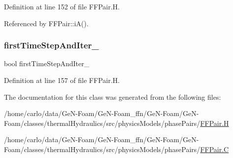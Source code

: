 Definition at line 152 of file F\+F\+Pair.\+H.



Referenced by F\+F\+Pair\+::i\+A().

\mbox{\label{classFoam_1_1FFPair_afb9a1b92dd096336989bbbea04ee183b}} 
\subsubsection{\texorpdfstring{first\+Time\+Step\+And\+Iter\+\_\+}{firstTimeStepAndIter\_}}
{\footnotesize\ttfamily bool first\+Time\+Step\+And\+Iter\+\_\+\hspace{0.3cm}{\ttfamily [protected]}}



Definition at line 157 of file F\+F\+Pair.\+H.



The documentation for this class was generated from the following files\+:\begin{DoxyCompactItemize}
\item 
/home/carlo/data/\+Ge\+N-\/\+Foam/\+Ge\+N-\/\+Foam\+\_\+ffn/\+Ge\+N-\/\+Foam/\+Ge\+N-\/\+Foam/classes/thermal\+Hydraulics/src/physics\+Models/phase\+Pairs/\hyperlink{FFPair_8H}{F\+F\+Pair.\+H}\item 
/home/carlo/data/\+Ge\+N-\/\+Foam/\+Ge\+N-\/\+Foam\+\_\+ffn/\+Ge\+N-\/\+Foam/\+Ge\+N-\/\+Foam/classes/thermal\+Hydraulics/src/physics\+Models/phase\+Pairs/\hyperlink{FFPair_8C}{F\+F\+Pair.\+C}\end{DoxyCompactItemize}
